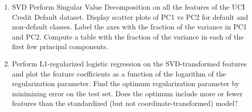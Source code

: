 \documentclass[12pt]{book}
\theoremstyle{definition}
\begin{document}
\begin{enumerate}
\item
SVD
Perform Singular Value Decomposition on all the features of the UCI Credit Default dataset.
Display scatter plots of PC1 vs PC2 for default and non-default classes.  
Label the axes with the fraction of the variance in PC1 and PC2.
Compute a table with the fraction of the variance in each of the first few principal components.

\item 
Perform L1-regularized logistic regression on the SVD-transformed features and plot the feature coefficients 
as a function of the logarithm of the regularization parameter. 
Find the optimum regularization parameter by minimizing error on the test set.  Does the optimum 
include more or fewer features than the standardized (but not coordinate-transformed) model?

\end{enumerate}
\end{document}

